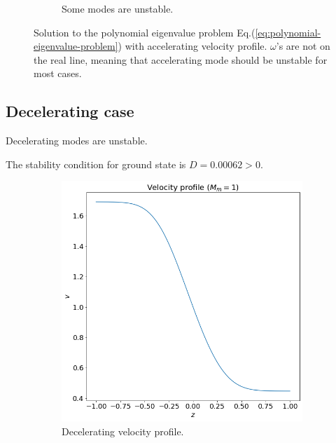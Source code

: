 \documentclass{article}
\theoremstyle{plain}
\theoremstyle{definition}
\theoremstyle{remark}
\theoremstyle{remark}
\begin{document}
\begin{figure}[H]
\begin{subfigure}[b]{0.5\linewidth}
        \caption{Some modes are unstable.}
    \end{subfigure}
    \caption{Solution to the polynomial eigenvalue problem Eq.(\ref{eq:polynomial-eigenvalue-problem}) with accelerating velocity profile. $\omega$'s are not on the real line, meaning that accelerating mode should be unstable for most cases.}
    \label{fig:accelerating}
\end{figure}


\newpage
\subsection{Decelerating case}
Decelerating modes are unstable.

The stability condition for ground state is $D=0.00062>0$.

\begin{figure}[H]
    \centering
    \begin{subfigure}[b]{0.5\linewidth}
        \includegraphics[width=\linewidth]{img/velocity-profile-decelerating.png}
        \caption{Decelerating velocity profile.}
    \end{subfigure}%
    \begin{subfigure}[b]{0.5\linewidth}

\end{subfigure}
\end{figure}
\end{document}
